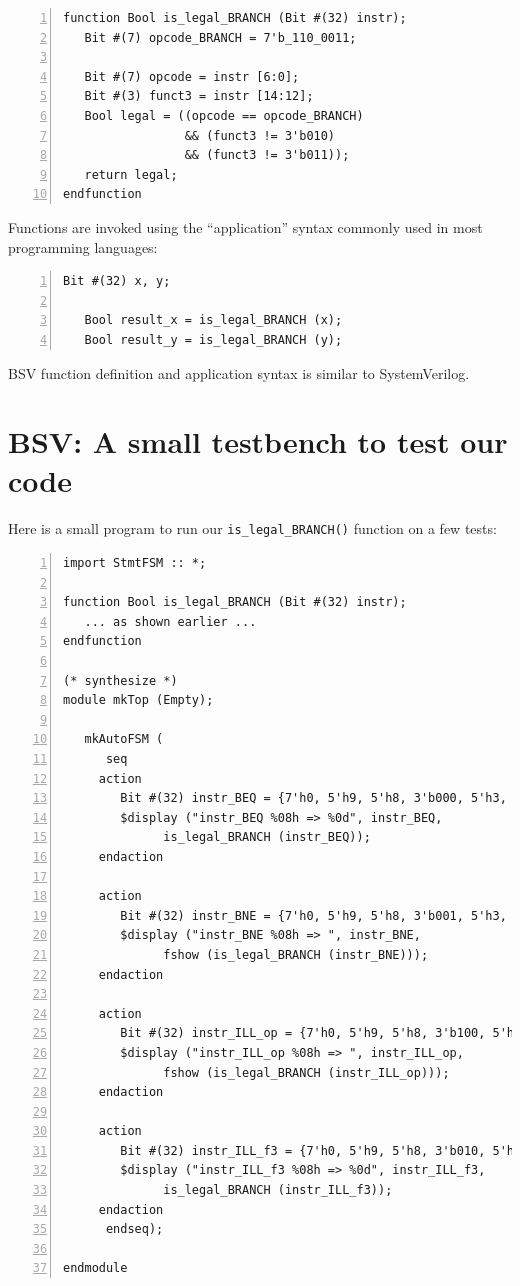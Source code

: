 \begin{Verbatim}[frame=single, numbers=left]
function Bool is_legal_BRANCH (Bit #(32) instr);
   Bit #(7) opcode_BRANCH = 7'b_110_0011;

   Bit #(7) opcode = instr [6:0];
   Bit #(3) funct3 = instr [14:12];
   Bool legal = ((opcode == opcode_BRANCH)
                 && (funct3 != 3'b010)
                 && (funct3 != 3'b011));
   return legal;
endfunction
\end{Verbatim}


Functions are invoked using the ``application'' syntax commonly used
in most programming languages:

\begin{Verbatim}[frame=single, numbers=left]
   Bit #(32) x, y;

   Bool result_x = is_legal_BRANCH (x);
   Bool result_y = is_legal_BRANCH (y);
\end{Verbatim}

BSV function definition and application syntax is similar to
SystemVerilog.


\section{BSV: A small testbench to test our code}

\label{BSV_small_testbench}


Here is a small program to run our \verb|is_legal_BRANCH()| function on
a few tests:

\begin{minipage}{6.5in}\small
\begin{Verbatim}[frame=single, numbers=left]
import StmtFSM :: *;

function Bool is_legal_BRANCH (Bit #(32) instr);
   ... as shown earlier ...
endfunction

(* synthesize *)
module mkTop (Empty);

   mkAutoFSM (
      seq
	 action
	    Bit #(32) instr_BEQ = {7'h0, 5'h9, 5'h8, 3'b000, 5'h3, 7'b_110_0011};
	    $display ("instr_BEQ %08h => %0d", instr_BEQ,
		      is_legal_BRANCH (instr_BEQ));
	 endaction

	 action
	    Bit #(32) instr_BNE = {7'h0, 5'h9, 5'h8, 3'b001, 5'h3, 7'b_110_0011};
	    $display ("instr_BNE %08h => ", instr_BNE,
		      fshow (is_legal_BRANCH (instr_BNE)));
	 endaction

	 action
	    Bit #(32) instr_ILL_op = {7'h0, 5'h9, 5'h8, 3'b100, 5'h3, 7'b_110_0000};
	    $display ("instr_ILL_op %08h => ", instr_ILL_op,
		      fshow (is_legal_BRANCH (instr_ILL_op)));
	 endaction

	 action
	    Bit #(32) instr_ILL_f3 = {7'h0, 5'h9, 5'h8, 3'b010, 5'h3, 7'b_110_0011};
	    $display ("instr_ILL_f3 %08h => %0d", instr_ILL_f3,
		      is_legal_BRANCH (instr_ILL_f3));
	 endaction
      endseq);

endmodule
\end{Verbatim}
\end{minipage}

